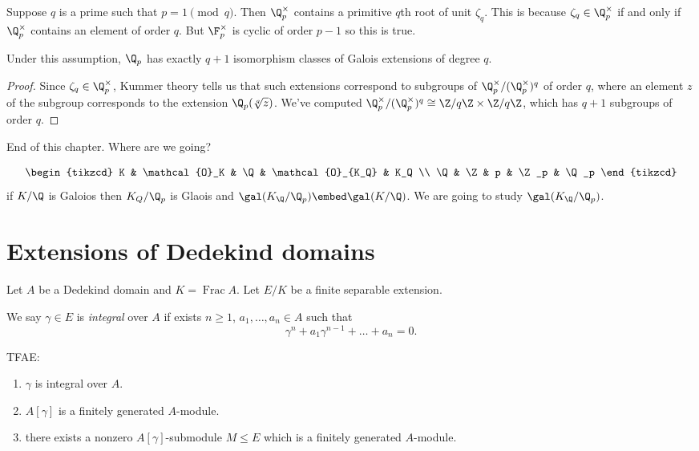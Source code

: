 \documentclass[a4paper]{article}
\DeclareMathOperator{\Frac}{Frac}
\renewcommand*{\O}{\mathcal{O}}
\begin{document}
Suppose \(q\) is a prime such that \(p = 1 \pmod q\). Then \(\Q_p^\times\) contains a primitive \(q\)th root of unit \(\zeta_q\). This is because \(\zeta_q \in \Q_p^\times\) if and only if \(\Q_p^\times\) contains an element of order \(q\). But \(\F_p^\times\) is cyclic of order \(p - 1\) so this is true.

\begin{lemma}
  Under this assumption, \(\Q_p\) has exactly \(q + 1\) isomorphism classes of Galois extensions of degree \(q\).
\end{lemma}

\begin{proof}
  Since \(\zeta_q \in \Q_p^\times\), Kummer theory tells us that such extensions correspond to subgroups of \(\Q_p^\times/(\Q_p^\times)^q\) of order \(q\), where an element \(z\) of the subgroup corresponds to the extension \(\Q_p(\sqrt[q]{z})\). We've computed \(\Q_p^\times/(\Q_p^\times)^q \cong \Z/q\Z \times \Z/q\Z\), which has \(q + 1\) subgroups of order \(q\).
\end{proof}

End of this chapter. Where are we going?

\[
  \begin{tikzcd}
    K & \O_K & \Q & \O_{K_Q} & K_Q \\
    \Q & \Z & p & \Z_p & \Q_p
  \end{tikzcd}
\]
if \(K/\Q\) is Galoios then \(K_Q/\Q_p\) is Glaois and \(\gal(K_\Q/\Q_p) \embed \gal(K/\Q)\). We are going to study \(\gal(K_\Q/\Q_p)\).

\section{Extensions of Dedekind domains}

Let \(A\) be a Dedekind domain and \(K = \Frac A\). Let \(E/K\) be a finite separable extension.

\begin{definition}
  We say \(\gamma \in E\) is \emph{integral} over \(A\) if exists \(n \geq 1\), \(a_1, \dots, a_n \in A\) such that
  \[
    \gamma^n + a_1 \gamma^{n - 1} + \dots + a_n = 0.
  \]
\end{definition}

\begin{lemma}
  TFAE:
  \begin{enumerate}
  \item \(\gamma\) is integral over \(A\).
  \item \(A[\gamma]\) is a finitely generated \(A\)-module.
  \item there exists a nonzero \(A[\gamma]\)-submodule \(M \leq E\) which is a finitely generated \(A\)-module.
  \end{enumerate}
\end{lemma}
\end{document}
